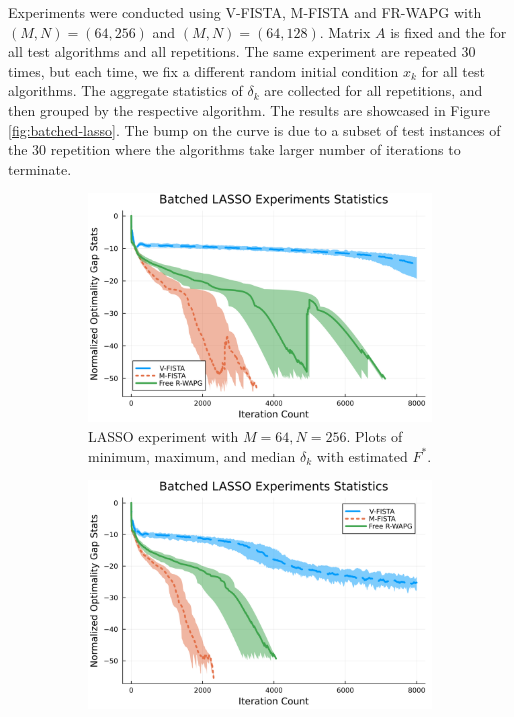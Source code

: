 \documentclass[12pt]{article}
\begin{document}
            Experiments were conducted using V-FISTA, M-FISTA and FR-WAPG with $(M, N) = (64, 256)$ and $(M, N) = (64, 128)$. 
            Matrix $A$ is fixed and the for all test algorithms and all repetitions. 
            The same experiment are repeated 30 times, but each time, we fix a different random initial condition $x_k$ for all test algorithms. 
            The aggregate statistics of $\delta_k$ are collected for all repetitions, and then grouped by the respective algorithm. 
            The results are showcased in Figure \ref{fig:batched-lasso}. 
            The bump on the curve is due to a subset of test instances of the 30 repetition where the algorithms take larger number of iterations to terminate. 
            \begin{figure}[H]
                \begin{subfigure}[b]{0.47\textwidth}
                    \centering
                    \includegraphics[width=\textwidth]{assets/lasso_batched_statistics_64-256.png}
                    \caption{LASSO experiment with $M = 64, N = 256$. Plots of minimum, maximum, and median $\delta_k$ with estimated $F^*$. }
                \end{subfigure}
                \hfill
                \begin{subfigure}[b]{0.47\textwidth}
                    \centering
                    \includegraphics[width=\textwidth]{assets/lasso_batched_statistics_64-128.png}

\end{subfigure}
\end{figure}
\end{document}

